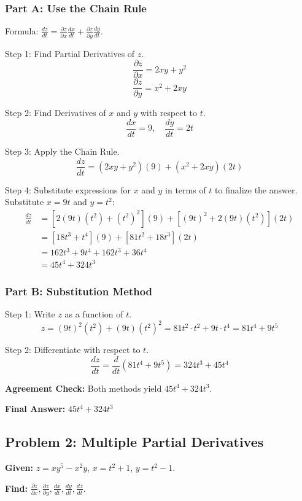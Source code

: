 \documentclass[11pt, letterpaper]{article}
\theoremstyle{definition}
\begin{document}
\subsubsection*{Part A: Use the Chain Rule}
Formula: $\frac{dz}{dt} = \frac{\partial z}{\partial x}\frac{dx}{dt} + \frac{\partial z}{\partial y}\frac{dy}{dt}$.

Step 1: Find Partial Derivatives of $z$.
\[ \frac{\partial z}{\partial x} = 2xy + y^2 \]
\[ \frac{\partial z}{\partial y} = x^2 + 2xy \]

Step 2: Find Derivatives of $x$ and $y$ with respect to $t$.
\[ \frac{dx}{dt} = 9, \quad \frac{dy}{dt} = 2t \]

Step 3: Apply the Chain Rule.
\[ \frac{dz}{dt} = (2xy + y^2)(9) + (x^2 + 2xy)(2t) \]

Step 4: Substitute expressions for $x$ and $y$ in terms of $t$ to finalize the answer.
Substitute $x=9t$ and $y=t^2$:
\begin{align*} 
\frac{dz}{dt} &= [2(9t)(t^2) + (t^2)^2](9) + [(9t)^2 + 2(9t)(t^2)](2t) \\
&= [18t^3 + t^4](9) + [81t^2 + 18t^3](2t) \\
&= 162t^3 + 9t^4 + 162t^3 + 36t^4 \\
&= 45t^4 + 324t^3 
\end{align*}

\subsubsection*{Part B: Substitution Method}
Step 1: Write $z$ as a function of $t$.
\[ z = (9t)^2(t^2) + (9t)(t^2)^2 = 81t^2 \cdot t^2 + 9t \cdot t^4 = 81t^4 + 9t^5 \]

Step 2: Differentiate with respect to $t$.
\[ \frac{dz}{dt} = \frac{d}{dt}(81t^4 + 9t^5) = 324t^3 + 45t^4 \]

\textbf{Agreement Check:} Both methods yield $45t^4 + 324t^3$.

\textbf{Final Answer:} $\boxed{45t^4 + 324t^3}$


\subsection*{Problem 2: Multiple Partial Derivatives}
\textbf{Given:} $z = xy^5 - x^2y$, $x = t^2 + 1$, $y = t^2 - 1$.

\textbf{Find:} $\frac{\partial z}{\partial x}, \frac{\partial z}{\partial y}, \frac{dx}{dt}, \frac{dy}{dt}, \frac{dz}{dt}$.
\end{document}
